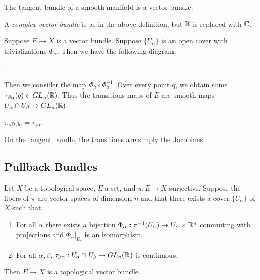 \documentclass[twoside, 10pt]{article}
\begin{document}
    \begin{exm}
        The tangent bundle of a smooth manifold is a vector bundle.
    \end{exm}

    \begin{defn}
        A \textit{complex vector bundle} is as in the above definition, but $\mathbb{R}$ is replaced with $\mathbb{C}$.
    \end{defn}

    Suppose $E \to X$ is a vector bundle. Suppose $\{U_{\alpha}\}$ is an open cover with trivializations $\Phi_{\alpha}$. Then we have the following diagram:
    \begin{center}
        .
    \end{center}

    Then we consider the map $\Phi_{\beta}\circ\Phi_{\alpha}^{-1}$. Over every point $q$, we obtain some $\tau_{\beta\alpha}(q) \in GL_n(\mathbb{R})$. Thus the transitions maps of $E$ are smooth maps $U_{\alpha} \cap U_{\beta} \to GL_n(\mathbb{R})$.

    \begin{prop}
        $\tau_{\gamma\beta}\tau_{\beta\alpha} = \tau_{\gamma\alpha}$.
    \end{prop}

    \begin{exm}
        On the tangent bundle, the transitions are simply the Jacobians.
    \end{exm}

    \subsection{Pullback Bundles}%
    \label{sub:pullback_bundles}
    
    

    \begin{lem}
        Let $X$ be a topological space, $E$ a set, and $\pi:E \to X$ surjective. Suppose the fibers of $\pi$ are vector spaces of dimension $n$ and that there exists a cover $\{U_{\alpha}\}$ of $X$ such that:
        \begin{enumerate}
            \item For all $\alpha$ there exists a bijection $\Phi_{\alpha}:\pi^{-1}(U_{\alpha}) \to U_{\alpha}\times \mathbb{R}^n$ commuting with projections and $\Phi_{\alpha}|_{E_q}$ is an isomorphism.
            \item For all $\alpha,\beta$, $\tau_{\beta\alpha}:U_{\alpha}\cap U_{\beta} \to GL_n(\mathbb{R})$ is continuous. 
        \end{enumerate}
        Then $E \to X$ is a topological vector bundle.
    \end{lem}
\end{document}
